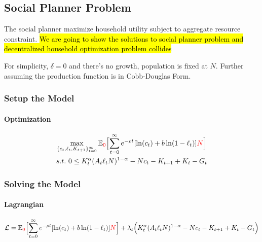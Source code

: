 \documentclass[11pt]{article}
\newcommand{\expat}[2]{\mathbb{E}_{#1}\Big[{#2}\Big]}
\begin{document}
		\subsection{Social Planner Problem}
			\par The social planner maximize household utility subject to aggregate resource constraint. \hl{We are going to show the solutions to social planner problem and decentralized household optimization problem collides }
			\begin{assumption}
				For simplicity, $\delta=0$ and there's no growth, population is fixed at $N$. Further assuming the production function is in Cobb-Douglas Form.
			\end{assumption}
		\subsubsection{Setup the Model}
			\paragraph{Optimization}
			\begin{gather}
				\max_{\{c_t, \ell_t, K_{t+1}\}_{t=0}^\infty} \expat{\textcolor{red}{0}}{\sum_{t=0}^\infty e^{-\rho t} [\ln(c_t) + b \ln(1-\ell_t)]\textcolor{red}{N}} \\
				s.t.\ 0 \leq K_t^\alpha (A_t \ell_t N)^{1-\alpha} - Nc_t - K_{t+1} + K_t - G_t
			\end{gather}
		\subsubsection{Solving the Model}
			\paragraph{Lagrangian}
			\begin{equation}
				\mc{L} = \expat{\textcolor{red}{0}}{\sum_{t=0}^\infty e^{-\rho t} [\ln(c_t) + b \ln(1-\ell_t)]\textcolor{red}{N}} + \lambda_t \Big (K_t^\alpha (A_t \ell_t N)^{1-\alpha} - Nc_t - K_{t+1} + K_t - G_t \Big )
			\end{equation}
			
\end{document}
